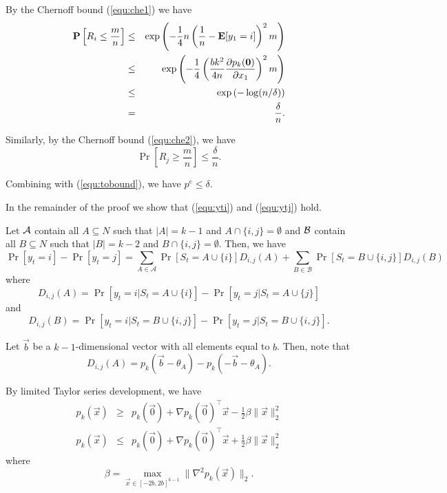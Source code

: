 By the Chernoff bound (\ref{equ:che1}) we have
\begin{eqnarray*}
\mathbf{P}\left[R_i \leq \frac{m}{n}\right] & \leq & \exp\left(-\frac{1}{4}n\left(\frac{1}{n} - \mathbf{E}[y_1 = i]\right)^2 m\right)\\
& \leq & \exp\left(-\frac{1}{4}\left(\frac{bk^2}{4n}\frac{\partial p_k(\mathbf{0})}{\partial x_1}\right)^2 m\right)\\
& \leq & \exp\left(-\log(n/\delta)\right)\\
&=& \frac{\delta}{n}.
\end{eqnarray*}

Similarly, by the Chernoff bound (\ref{equ:che2}), we have
$$
\Pr\left[R_j \geq \frac{m}{n}\right] \leq \frac{\delta}{n}.
$$

Combining with (\ref{equ:tobound}), we have $p^e \leq \delta$.

In the remainder of the proof we show that (\ref{equ:yti}) and (\ref{equ:ytj}) hold.

Let ${\mathcal A}$ contain all $A \subseteq N$ such that $|A| = k-1$ and $A\cap\{i,j\}=\emptyset$ and ${\mathcal B}$ contain all $B\subseteq N$ such that $|B| = k-2$ and $B\cap\{i,j\}=\emptyset$. Then, we have
\begin{equation}
\Pr[ y_t = i ] - \Pr[ y_t = j ] = \sum_{A\in \mathcal{A}} \Pr[S_t = A\cup\{i\}] D_{i,j}(A) +\sum_{B\in \mathcal{B}} \Pr[S_t = B \cup \{i,j\}] D_{i,j}(B) \label{eq:prdifer}
\end{equation}
where
$$
D_{i,j}(A) = \Pr[ y_t = i | S_t= A\cup\{i \} ] - \Pr[ y_t = j| S_t= A\cup\{j \}]
$$
and
$$
D_{i,j}(B) = \Pr[ y_t = i | S_t= B\cup\{i,j \}] -\Pr[ y_t = j | S_t= B\cup\{i,j \}].
$$

Let $\vec{b}$ be a $k-1$-dimensional vector with all elements equal to $b$. Then, note that
$$
D_{i,j}(A) = p_k (\vec{b}-\theta_{A})- p_k (-\vec{b}-\theta_{A}).
$$

By limited Taylor series development, we have
\begin{eqnarray}
p_k (\vec{x}) &\ge& p_k (\vec{0}) + \nabla p_k (\vec{0})^\top \vec{x} - \frac{1}{2} \beta \|\vec{x}\|_2^2 \label{equ:ptaylor1}\\
p_k (\vec{x}) &\le& p_k (\vec{0}) + \nabla p_k (\vec{0})^\top \vec{x} + \frac{1}{2} \beta \|\vec{x}\|_2^2
\label{equ:ptaylor2}
\end{eqnarray}
where 
\begin{equation}
\beta = \max_{\vec{x}\in [-2b,2b]^{k-1}} \|\nabla^2 p_k (\vec{x}) \|_2.
\label{equ:betaparam}
\end{equation}

